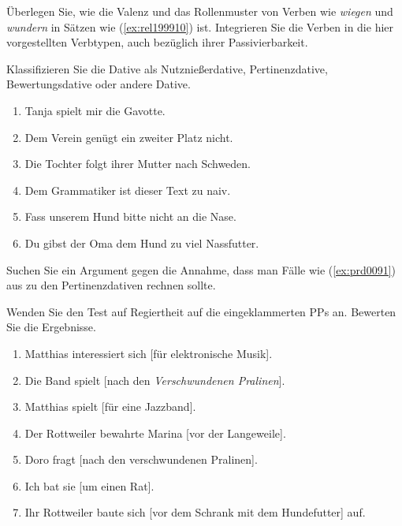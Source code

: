 \Uebung[\tristar] \label{u133} Überlegen Sie, wie die Valenz und das Rollenmuster von Verben wie \textit{wiegen} und \textit{wundern} in Sätzen wie (\ref{ex:rel199910}) ist.
Integrieren Sie die Verben in die hier vorgestellten Verbtypen, auch bezüglich ihrer Passivierbarkeit.

\begin{exe}
  \ex\label{ex:rel199910}
  \begin{xlist}
  \end{xlist}
\end{exe}

\Uebung \label{u134} Klassifizieren Sie die Dative als Nutznießerdative, Pertinenzdative, Bewertungsdative oder andere Dative.

\begin{enumerate}\Lf
  \item Tanja spielt mir die Gavotte.
  \item Dem Verein genügt ein zweiter Platz nicht.
  \item Die Tochter folgt ihrer Mutter nach Schweden.
  \item Dem Grammatiker ist dieser Text zu naiv.
  \item Fass unserem Hund bitte nicht an die Nase.
  \item Du gibst der Oma dem Hund zu viel Nassfutter.
\end{enumerate}

\Uebung[\tristar] \label{u135} Suchen Sie ein Argument gegen die Annahme, dass man Fälle wie (\ref{ex:prd0091}) aus \citet[299]{Eisenberg2} zu den Pertinenzdativen rechnen sollte.

\begin{exe}
\end{exe}

\Uebung \label{u136} Wenden Sie den Test auf Regiertheit auf die eingeklammerten PPs an.
Bewerten Sie die Ergebnisse.

\begin{enumerate}\Lf
  \item Matthias interessiert sich [für elektronische Musik].
  \item Die Band spielt [nach den \textit{Verschwundenen Pralinen}].
  \item Matthias spielt [für eine Jazzband].
  \item Der Rottweiler bewahrte Marina [vor der Langeweile].
  \item Doro fragt [nach den verschwundenen Pralinen].
  \item Ich bat sie [um einen Rat].
  \item Ihr Rottweiler baute sich [vor dem Schrank mit dem Hundefutter] auf.
\end{enumerate}

